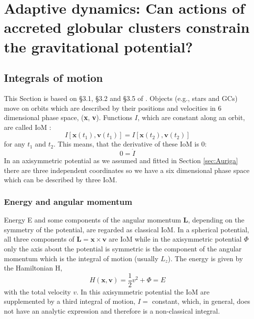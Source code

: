 \section[Adaptive dynamics]{Adaptive dynamics: Can actions of accreted globular clusters constrain the gravitational potential?}\label{sec:Dynamics}

\subsection{Integrals of motion}
This Section is based on \S3.1, \S3.2 and \S3.5 of \citet{Binney...Tremaine...2008}. Objects (e.g., stars and \acp{GC}) move on orbits which are described by their positions and velocities in 6 dimensional phase space, (\textbf{x}, \textbf{v}). Functions $I$, which are constant along an orbit, are called \acf{IoM} \citep{Binney...Tremaine...2008}:
\begin{equation}
    I[\mathbf{x}(t_1), \mathbf{v}(t_1)] = I[\mathbf{x}(t_2), \mathbf{v}(t_2)]
\end{equation}
for any $t_1$ and $t_2$. This means, that the derivative of these \ac{IoM} is 0:
\begin{equation}\label{eq:der_IoM}
    0 = \dot{I}
\end{equation}
In an axisymmetric potential as we assumed and fitted in Section \ref{sec:Auriga} there are three independent coordinates so we have a six dimensional phase space which can be described by three \ac{IoM}. 
\subsubsection{Energy and angular momentum}
Energy E and some components of the angular momentum \textbf{L}, depending on the symmetry of the potential, are regarded as classical \ac{IoM}. In a spherical potential, all three components of $\textbf{L} = \textbf{x} \times \textbf{v}$ are \ac{IoM} while in the axisymmetric potential $\Phi$ only the axis about the potential is symmetric is the component of the angular momentum which is the integral of motion (usually $L_z$). The energy is given by the Hamiltonian H,
\begin{equation}\label{eq:energy_hamiltonian}
    H(\mathbf{x, v}) = \frac{1}{2}v^2 + \Phi = E
\end{equation}
with the total velocity $v$. In this axisymmetric potential the \ac{IoM} are supplemented by a third integral of motion, $I =$ constant, which, in general, does not have an analytic expression and therefore is a non-classical integral. 
